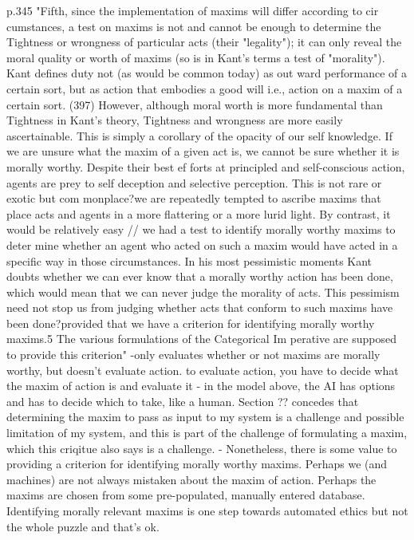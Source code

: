 p.345
"Fifth, since the implementation of maxims will differ according to cir
 cumstances, a test on maxims is not and cannot be enough to determine the
 Tightness or wrongness of particular acts (their "legality"); it can only
 reveal the moral quality or worth of maxims (so is in Kant's terms a test of
 "morality"). Kant defines duty not (as would be common today) as out
 ward performance of a certain sort, but as action that embodies a good will
 i.e., action on a maxim of a certain sort. (397) However, although moral
 worth is more fundamental than Tightness in Kant's theory, Tightness and
 wrongness are more easily ascertainable. This is simply a corollary of the
 opacity of our self knowledge. If we are unsure what the maxim of a given
 act is, we cannot be sure whether it is morally worthy. Despite their best ef
 forts at principled and self-conscious action, agents are prey to self
 deception and selective perception. This is not rare or exotic but com
 monplace?we are repeatedly tempted to ascribe maxims that place acts and
 agents in a more flattering or a more lurid light. By contrast, it would be
 relatively easy // we had a test to identify morally worthy maxims to deter
 mine whether an agent who acted on such a maxim would have acted in a
 specific way in those circumstances. In his most pessimistic moments Kant
 doubts whether we can ever know that a morally worthy action has been
 done, which would mean that we can never judge the morality of acts. This
 pessimism need not stop us from judging whether acts that conform to such
 maxims have been done?provided that we have a criterion for identifying
 morally worthy maxims.5 The various formulations of the Categorical Im
 perative are supposed to provide this criterion"
-only evaluates whether or not maxims are morally worthy, but doesn't evaluate action. to evaluate 
action, you have to decide what the maxim of action is and evaluate it
  - in the model above, the AI has options and has to decide which to take, like a human. Section ??
concedes that determining the maxim to pass as input to my system is a challenge and possible limitation
of my system, and this is part of the challenge of formulating a maxim, which this criqitue also 
says is a challenge.
  - Nonetheless, there is some value to providing a criterion for identifying morally worthy maxims. 
Perhaps we (and machines) are not always mistaken about the maxim of action. Perhaps the maxims are chosen
from some pre-populated, manually entered database. Identifying morally relevant maxims is one step 
towards automated ethics but not the whole puzzle and that's ok. 
